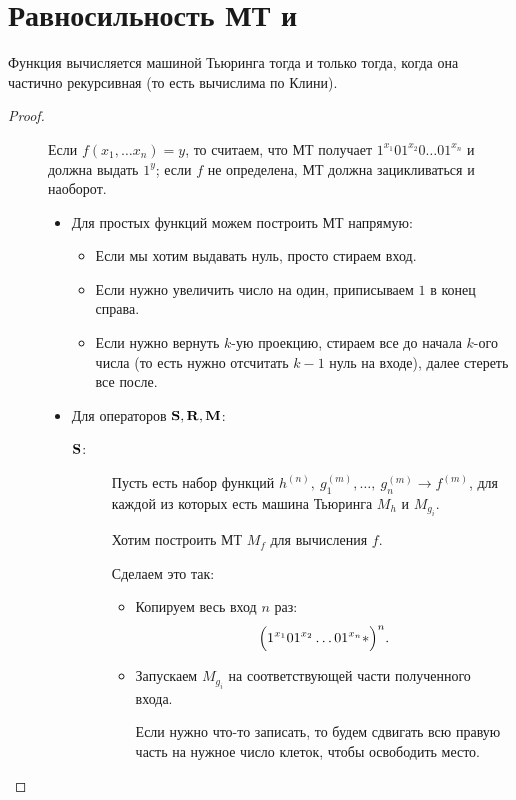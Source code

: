 \section{Равносильность МТ и \crf} 
\begin{thm}
	Функция вычисляется машиной Тьюринга тогда и только тогда, когда она частично рекурсивная (то есть вычислима по Клини).
\end{thm}
\begin{proof}
    \begin{description}
		\item[]
			Если $ f(x_1, \ldots x_n) = y$, то считаем, что МТ получает $ 1^{x_1}01^{x_2}0\ldots 01^{x_n}$ и должна выдать $ 1^{y}$; если  $ f$ не определена, МТ должна зацикливаться и наоборот.
			\begin{itemize}
				\item Для простых функций можем построить МТ напрямую:
					\begin{itemize}
						\item Если мы хотим выдавать нуль, просто стираем вход.
						\item Если нужно увеличить число на один, приписываем $ 1$ в конец справа.
						\item Если нужно вернуть $ k$-ую проекцию, стираем все до начала $ k$-ого числа (то есть нужно отсчитать $ k-1$ нуль на входе), далее стереть все после.
					\end{itemize}
				\item Для операторов $ \S, \R, \M$:
					\begin{description}
						\item[$ \S$:]
							Пусть есть набор функций $ h^{(n)}, ~ g_1^{(m)}, \ldots , ~ g_n^{(m)} \longrightarrow f^{(m)}$, для каждой из которых есть машина Тьюринга $ M_{h}$ и $ M_{g_{i}}$. 

							Хотим построить МТ $ M_{f}$ для вычисления $ f$.

							Сделаем это так:
							\begin{itemize}
								\item Копируем весь вход $ n$ раз:
									\[
										\Bigl(1^{x_1}01^{x_2}\ldots 01^{x_n} \ast \Bigr)^{n}
									.\] 
								\item Запускаем $ M_{g_i}$ на соответствующей части полученного входа. 

							Если нужно что-то записать, то будем сдвигать всю правую часть на нужное число клеток, чтобы освободить место.


\end{itemize}
\end{description}
\end{itemize}
\end{description}
\end{proof}
